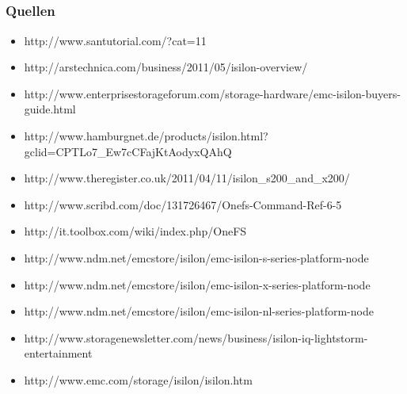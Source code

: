 \documentclass{beamer}
\begin{document}
\subsection{}
\begin{frame}[fragile]
  \frametitle{Quellen}

  \tiny
  \begin{itemize}
    \item http://www.santutorial.com/?cat=11
    \item http://arstechnica.com/business/2011/05/isilon-overview/
    \item http://www.enterprisestorageforum.com/storage-hardware/emc-isilon-buyers-guide.html
    \item http://www.hamburgnet.de/products/isilon.html?gclid=CPTLo7\_Ew7cCFajKtAodyxQAhQ
    \item http://www.theregister.co.uk/2011/04/11/isilon\_s200\_and\_x200/
    \item http://www.scribd.com/doc/131726467/Onefs-Command-Ref-6-5
    \item http://it.toolbox.com/wiki/index.php/OneFS
    \item http://www.ndm.net/emcstore/isilon/emc-isilon-s-series-platform-node
    \item http://www.ndm.net/emcstore/isilon/emc-isilon-x-series-platform-node
    \item http://www.ndm.net/emcstore/isilon/emc-isilon-nl-series-platform-node
    \item http://www.storagenewsletter.com/news/business/isilon-iq-lightstorm-entertainment
    \item http://www.emc.com/storage/isilon/isilon.htm 
    
  \end{itemize}

\end{frame}
\end{document}
